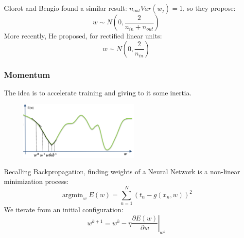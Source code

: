
Glorot and Bengio found a similar result: $n_{out}Var(w_j) = 1$, so they propose: 
$$w \sim N \left( 0,\frac{2}{n_{in} + n_{out}} \right)$$
More recently, He proposed, for rectified linear units:
$$w \sim N \left( 0,\frac{2}{n_{in}} \right)$$

\subsubsection{Momentum}
The idea is to accelerate training and giving to it some inertia.\\

\begin{figure}
    \includegraphics[width=6cm]{images/local_minima.png}
\end{figure}  

Recalling Backpropagation, finding weights of a Neural Network is a non-linear minimization process: 
$$
\operatorname{argmin}_{w} E(w)=\sum_{n=1}^{N}\left(t_{n}-g\left(x_{n}, w\right)\right)^{2}
$$
We iterate from an initial configuration:
$$
w^{k+1}=w^{k}-\left.\eta \frac{\partial E(w)}{\partial w}\right|_{w^{k}}
$$


